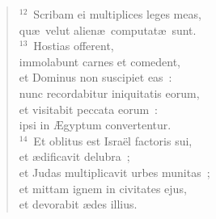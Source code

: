 \begin{flushleft}
\begin{verse}
${}^{12}$~Scribam ei multiplices leges meas,\\ qu\ae\ velut alien\ae\ computat\ae\ sunt.\\
${}^{13}$~Hostias offerent,\\ immolabunt carnes et comedent,\\ et Dominus non suscipiet eas~:\\ nunc recordabitur iniquitatis eorum,\\ et visitabit peccata eorum~:\\ ipsi in \AE gyptum convertentur.\\
${}^{14}$~Et oblitus est Isra\"el factoris sui,\\ et \ae dificavit delubra~;\\ et Judas multiplicavit urbes munitas~;\\ et mittam ignem in civitates ejus,\\ et devorabit \ae des illius.\end{verse}\end{flushleft}


